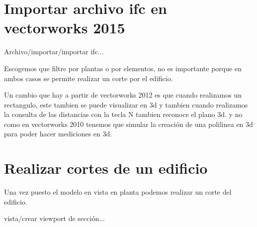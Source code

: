 \section{Importar archivo ifc en vectorworks 2015}

Archivo/importar/importar ifc...

Escogemos que filtre por plantas o por elementos, no es importante porque
en ambos casos se permite realizar un corte por el edificio.

Un cambio que hay a partir de vectorworks 2012 es que cuando realizamos un
rectangulo, este tambien se puede visualizar en 3d y tambien cuando realizamos
la consulta de las distancias con la tecla N tambien reconoce el plano 3d.
y no como en vectorworks 2010 tenemos que simular la creación de una polilinea
en 3d para poder hacer mediciones en 3d.

\section{Realizar cortes de un edificio}

Una vez puesto el modelo en vista en planta podemos realizar un corte
del edificio.

vista/crear viewport de sección...




